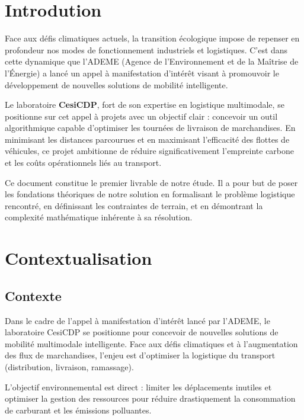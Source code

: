 \section*{Introdution}

Face aux défis climatiques actuels, la transition écologique impose de repenser en profondeur nos modes de fonctionnement industriels et logistiques. C'est dans cette dynamique que l'ADEME (Agence de l'Environnement et de la Maîtrise de l'Énergie) a lancé un appel à manifestation d'intérêt visant à promouvoir le développement de nouvelles solutions de mobilité intelligente. 

\noindent Le laboratoire \textbf{CesiCDP}, fort de son expertise en logistique multimodale, se positionne sur cet appel à projets avec un objectif clair : concevoir un outil algorithmique capable d'optimiser les tournées de livraison de marchandises. En minimisant les distances parcourues et en maximisant l'efficacité des flottes de véhicules, ce projet ambitionne de réduire significativement l'empreinte carbone et les coûts opérationnels liés au transport.

\noindent Ce document constitue le premier livrable de notre étude. Il a pour but de poser les fondations théoriques de notre solution en formalisant le problème logistique rencontré, en définissant les contraintes de terrain, et en démontrant la complexité mathématique inhérente à sa résolution.

\newpage

\section{Contextualisation}

\subsection{Contexte}


Dans le cadre de l'appel à manifestation d'intérêt lancé par l'ADEME, le laboratoire CesiCDP se positionne pour concevoir de nouvelles solutions de mobilité multimodale intelligente. Face aux défis climatiques et à l'augmentation des flux de marchandises, l'enjeu est d'optimiser la logistique du transport (distribution, livraison, ramassage).

\noindent L'objectif environnemental est direct : limiter les déplacements inutiles et optimiser la gestion des ressources pour réduire drastiquement la consommation de carburant et les émissions polluantes.

